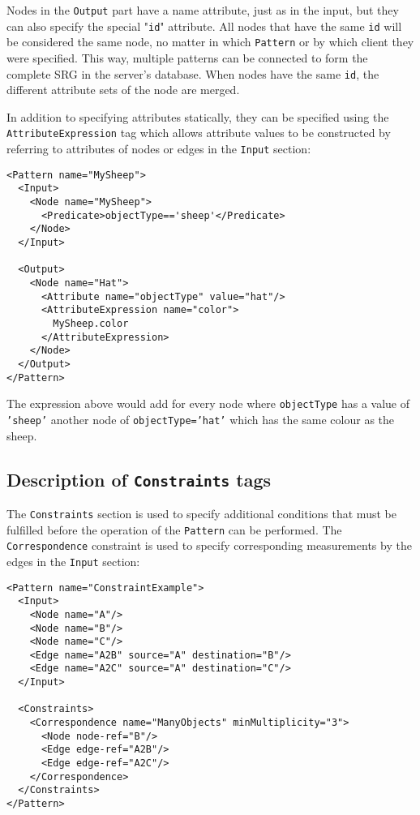 \documentclass[11pt]{article}
\begin{document}
Nodes in the \texttt{Output} part have a
name attribute, just as in the input, but they can also specify the special "\texttt{id}"
attribute. All nodes that have the same \texttt{id} will be considered
the same node, no matter in which \texttt{Pattern} or by which client they were
specified. This way, multiple patterns can be connected to form the complete
SRG in the server's database. When nodes have the same \texttt{id}, the different
attribute sets of the node are merged.

In addition to specifying attributes
statically, they can be specified using the \texttt{AttributeExpression} tag
which allows attribute values to be constructed by referring to attributes of
nodes or edges in the \texttt{Input} section:

\begin{Verbatim}[fontsize=\footnotesize,tabsize=2] 
<Pattern name="MySheep">
  <Input>
    <Node name="MySheep">
      <Predicate>objectType=='sheep'</Predicate>
    </Node>
  </Input>

  <Output>
    <Node name="Hat">
      <Attribute name="objectType" value="hat"/>
      <AttributeExpression name="color">
        MySheep.color
      </AttributeExpression>
    </Node>
  </Output>
</Pattern>
\end{Verbatim} 

The expression above would add for every
node where \texttt{objectType} has a value of \texttt{'sheep'} another node of \texttt{objectType='hat'} which has the
same colour as the sheep.

\subsection{Description of  \texttt{Constraints} tags}
\label{constraints}

The \texttt{Constraints} section is used to specify additional conditions that must be fulfilled before the
operation of the \texttt{Pattern} can be performed. The \texttt{Correspondence} constraint
is used to specify corresponding measurements by the edges in the \texttt{Input} section:

\begin{Verbatim}[fontsize=\footnotesize,tabsize=2] 
<Pattern name="ConstraintExample">
  <Input>
    <Node name="A"/>
    <Node name="B"/>
    <Node name="C"/>
    <Edge name="A2B" source="A" destination="B"/>
    <Edge name="A2C" source="A" destination="C"/>
  </Input>

  <Constraints>
    <Correspondence name="ManyObjects" minMultiplicity="3">
      <Node node-ref="B"/>
      <Edge edge-ref="A2B"/>
      <Edge edge-ref="A2C"/>
    </Correspondence>
  </Constraints>
</Pattern>
\end{Verbatim} 
\end{document}
